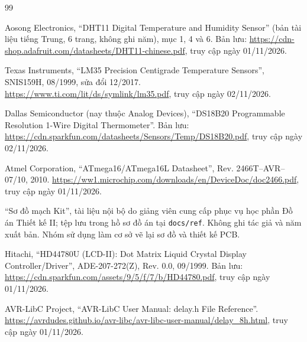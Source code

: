 \begin{thebibliography}{99}

Aosong Electronics, ``DHT11 Digital Temperature and Humidity Sensor'' (bản tài liệu tiếng Trung, 6 trang, không ghi năm), mục 1, 4 và 6. Bản lưu: \url{https://cdn-shop.adafruit.com/datasheets/DHT11-chinese.pdf}, truy cập ngày 01/11/2026.

Texas Instruments, ``LM35 Precision Centigrade Temperature Sensors'', SNIS159H, 08/1999, sửa đổi 12/2017. \url{https://www.ti.com/lit/ds/symlink/lm35.pdf}, truy cập ngày 02/11/2026.

Dallas Semiconductor (nay thuộc Analog Devices), ``DS18B20 Programmable Resolution 1-Wire Digital Thermometer''. Bản lưu: \url{https://cdn.sparkfun.com/datasheets/Sensors/Temp/DS18B20.pdf}, truy cập ngày 02/11/2026.

Atmel Corporation, ``ATmega16/ATmega16L Datasheet'', Rev. 2466T--AVR--07/10, 2010. \url{https://ww1.microchip.com/downloads/en/DeviceDoc/doc2466.pdf}, truy cập ngày 01/11/2026.

``Sơ đồ mạch Kit'', tài liệu nội bộ do giảng viên cung cấp phục vụ học phần Đồ án Thiết kế II; tệp lưu trong hồ sơ đồ án tại \texttt{docs/ref}. Không ghi tác giả và năm xuất bản. Nhóm sử dụng làm cơ sở vẽ lại sơ đồ và thiết kế PCB.

Hitachi, ``HD44780U (LCD-II): Dot Matrix Liquid Crystal Display Controller/Driver'', ADE-207-272(Z), Rev. 0.0, 09/1999. Bản lưu: \url{https://cdn.sparkfun.com/assets/9/5/f/7/b/HD44780.pdf}, truy cập ngày 01/11/2026.

AVR-LibC Project, ``AVR-LibC User Manual: delay.h File Reference''. \url{https://avrdudes.github.io/avr-libc/avr-libc-user-manual/delay_8h.html}, truy cập ngày 01/11/2026.

\end{thebibliography}
